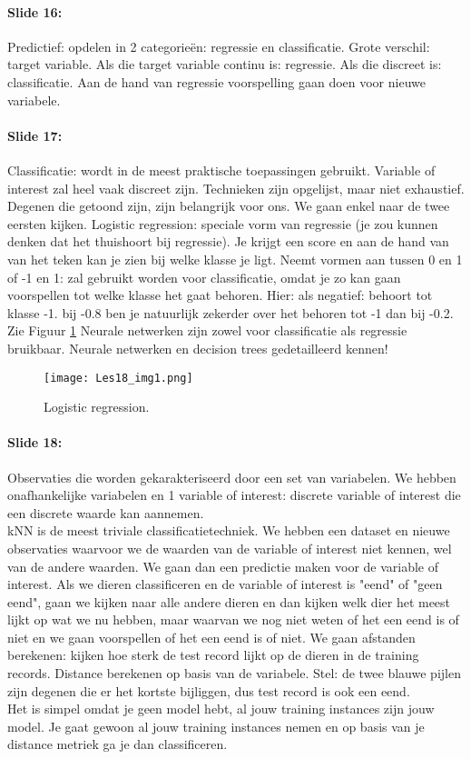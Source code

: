 \documentclass[10pt,a4paper]{report}
\begin{document}
\paragraph{Slide 16:}Predictief: opdelen in 2 categorieën: regressie en classificatie. Grote verschil: target variable. Als die target variable continu is: regressie. Als die discreet is: classificatie. 
Aan de hand van regressie voorspelling gaan doen voor nieuwe variabele.

\paragraph{Slide 17:}Classificatie: wordt in de meest praktische toepassingen gebruikt. Variable of interest zal heel vaak discreet zijn.
Technieken zijn opgelijst, maar niet exhaustief. Degenen die getoond zijn, zijn belangrijk voor ons. We gaan enkel naar de twee eersten kijken. Logistic regression: speciale vorm van regressie (je zou kunnen denken dat het thuishoort bij regressie).
Je krijgt een score en aan de hand van van het teken kan je zien bij welke klasse je ligt. Neemt vormen aan tussen 0 en 1 of -1 en 1: zal gebruikt worden voor classificatie, omdat je zo kan gaan voorspellen tot welke klasse het gaat behoren. Hier: als negatief: behoort tot klasse -1. bij -0.8 ben je natuurlijk zekerder over het behoren tot -1 dan bij -0.2. Zie Figuur \ref{18_1}
Neurale netwerken zijn zowel voor classificatie als regressie bruikbaar. 
Neurale netwerken en decision trees gedetailleerd kennen!

\begin{figure}[ht!]
\centering
\texttt{[image: Les18\_img1.png]}
\caption{Logistic regression. \label{18_1}}
\end{figure}

\paragraph{Slide 18:}Observaties die worden gekarakteriseerd door een set van variabelen. We hebben onafhankelijke variabelen en 1 variable of interest: discrete variable of interest die een discrete waarde kan aannemen.\\
kNN is de meest triviale classificatietechniek. We hebben een dataset en nieuwe observaties waarvoor we de waarden van de variable of interest niet kennen, wel van de andere waarden. We gaan dan een predictie maken voor de variable of interest. Als we dieren classificeren en de variable of interest is "eend" of "geen eend", gaan we kijken naar alle andere dieren en dan kijken welk dier het meest lijkt op wat we nu hebben, maar waarvan we nog niet weten of het een eend is of niet en we gaan voorspellen of het een eend is of niet. We gaan afstanden berekenen: kijken hoe sterk de test record lijkt op de dieren in de training records. Distance berekenen op basis van de variabele. Stel: de twee blauwe pijlen zijn degenen die er het kortste bijliggen, dus test record is ook een eend.\\
Het is simpel omdat je geen model hebt, al jouw training instances zijn jouw model. Je gaat gewoon al jouw training instances nemen en op basis van je distance metriek ga je dan classificeren.
\end{document}
